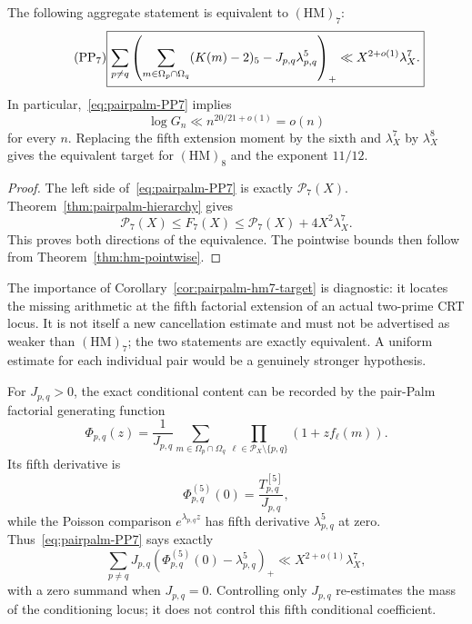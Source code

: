 \begin{corollary}
\label{cor:pairpalm-hm7-target}
The following aggregate statement is equivalent to $(\mathrm{HM})_7$:
\begin{equation}\tag{$\mathrm{PP}_7$}\label{eq:pairpalm-PP7}
 \boxed{
 \sum_{p\ne q}
 \left(
  \sum_{m\in\Omega_p\cap\Omega_q}(K(m)-2)_5
  -J_{p,q}\lambda_{p,q}^5
 \right)_+
 \ll X^{2+o(1)}\lambda_X^7.}
\end{equation}
In particular,~\eqref{eq:pairpalm-PP7} implies
\[
 \log G_n\ll n^{20/21+o(1)}=o(n)
\]
for every $n$.  Replacing the fifth extension moment by the sixth and
$\lambda_X^7$ by $\lambda_X^8$ gives the equivalent target for
$(\mathrm{HM})_8$ and the exponent $11/12$.
\end{corollary}

\begin{proof}
The left side of~\eqref{eq:pairpalm-PP7} is exactly
$\mathscr P_7(X)$.  Theorem~\ref{thm:pairpalm-hierarchy} gives
\[
 \mathscr P_7(X)\leq F_7(X)
 \leq\mathscr P_7(X)+4X^2\lambda_X^7.
\]
This proves both directions of the equivalence.  The pointwise bounds
then follow from Theorem~\ref{thm:hm-pointwise}.
\end{proof}

The importance of Corollary~\ref{cor:pairpalm-hm7-target} is diagnostic:
it locates the missing arithmetic at the fifth factorial extension of
an actual two-prime CRT locus.  It is not itself a new cancellation
estimate and must not be advertised as weaker than $(\mathrm{HM})_7$;
the two statements are exactly equivalent.  A uniform estimate for
each individual pair would be a genuinely stronger hypothesis.

For $J_{p,q}>0$, the exact conditional content can be recorded by the
pair-Palm factorial generating function
\begin{equation}\label{eq:pairpalm-pgf}
 \Phi_{p,q}(z)
 =\frac1{J_{p,q}}
  \sum_{m\in\Omega_p\cap\Omega_q}
  \prod_{\ell\in\mathcal P_X\setminus\{p,q\}}
       (1+zf_\ell(m)).
\end{equation}
Its fifth derivative is
\[
 \Phi_{p,q}^{(5)}(0)=\frac{T_{p,q}^{[5]}}{J_{p,q}},
\]
while the Poisson comparison $e^{\lambda_{p,q}z}$ has fifth derivative
$\lambda_{p,q}^5$ at zero.  Thus~\eqref{eq:pairpalm-PP7} says exactly
\begin{equation}\label{eq:pairpalm-pgf-target}
 \sum_{p\ne q}J_{p,q}
 \left(\Phi_{p,q}^{(5)}(0)-\lambda_{p,q}^5\right)_+
 \ll X^{2+o(1)}\lambda_X^7,
\end{equation}
with a zero summand when $J_{p,q}=0$.  Controlling only $J_{p,q}$
re-estimates the mass of the conditioning locus; it does not control this
fifth conditional coefficient.

